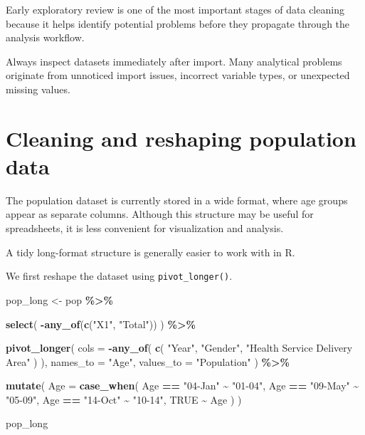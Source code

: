 \documentclass[
  11pt,
  oneside]{book}
\newenvironment{Shaded}{\begin{snugshade}}{\end{snugshade}}
\newcommand{\AttributeTok}[1]{\textcolor[rgb]{0.13,0.29,0.53}{#1}}
\newcommand{\ConstantTok}[1]{\textcolor[rgb]{0.56,0.35,0.01}{#1}}
\newcommand{\FunctionTok}[1]{\textcolor[rgb]{0.13,0.29,0.53}{\textbf{#1}}}
\newcommand{\NormalTok}[1]{#1}
\newcommand{\OtherTok}[1]{\textcolor[rgb]{0.56,0.35,0.01}{#1}}
\newcommand{\SpecialCharTok}[1]{\textcolor[rgb]{0.81,0.36,0.00}{\textbf{#1}}}
\newcommand{\StringTok}[1]{\textcolor[rgb]{0.31,0.60,0.02}{#1}}
\begin{document}
Early exploratory review is one of the most important stages of data cleaning because it helps identify potential problems before they propagate through the analysis workflow.

Always inspect datasets immediately after import. Many analytical problems originate from unnoticed import issues, incorrect variable types, or unexpected missing values.

\section{Cleaning and reshaping population data}\label{cleaning-and-reshaping-population-data}

The population dataset is currently stored in a wide format, where age groups appear as separate columns. Although this structure may be useful for spreadsheets, it is less convenient for visualization and analysis.

A tidy long-format structure is generally easier to work with in R.

We first reshape the dataset using \texttt{pivot\_longer()}.

\begin{Shaded}
\begin{Highlighting}[]
\NormalTok{pop\_long }\OtherTok{\textless{}{-}}\NormalTok{ pop }\SpecialCharTok{\%\textgreater{}\%}
  
  \FunctionTok{select}\NormalTok{(}
    \SpecialCharTok{{-}}\FunctionTok{any\_of}\NormalTok{(}\FunctionTok{c}\NormalTok{(}\StringTok{"X1"}\NormalTok{, }\StringTok{"Total"}\NormalTok{))}
\NormalTok{  ) }\SpecialCharTok{\%\textgreater{}\%}
  
  \FunctionTok{pivot\_longer}\NormalTok{(}
    \AttributeTok{cols =} \SpecialCharTok{{-}}\FunctionTok{any\_of}\NormalTok{(}
      \FunctionTok{c}\NormalTok{(}
        \StringTok{"Year"}\NormalTok{,}
        \StringTok{"Gender"}\NormalTok{,}
        \StringTok{"Health Service Delivery Area"}
\NormalTok{      )}
\NormalTok{    ),}
    \AttributeTok{names\_to =} \StringTok{"Age"}\NormalTok{,}
    \AttributeTok{values\_to =} \StringTok{"Population"}
\NormalTok{  ) }\SpecialCharTok{\%\textgreater{}\%}
  
  \FunctionTok{mutate}\NormalTok{(}
    \AttributeTok{Age =} \FunctionTok{case\_when}\NormalTok{(}
\NormalTok{      Age }\SpecialCharTok{==} \StringTok{"04{-}Jan"} \SpecialCharTok{\textasciitilde{}} \StringTok{"01{-}04"}\NormalTok{,}
\NormalTok{      Age }\SpecialCharTok{==} \StringTok{"09{-}May"} \SpecialCharTok{\textasciitilde{}} \StringTok{"05{-}09"}\NormalTok{,}
\NormalTok{      Age }\SpecialCharTok{==} \StringTok{"14{-}Oct"} \SpecialCharTok{\textasciitilde{}} \StringTok{"10{-}14"}\NormalTok{,}
      \ConstantTok{TRUE} \SpecialCharTok{\textasciitilde{}}\NormalTok{ Age}
\NormalTok{    )}
\NormalTok{  )}

\NormalTok{pop\_long}
\end{Highlighting}
\end{Shaded}
\end{document}
